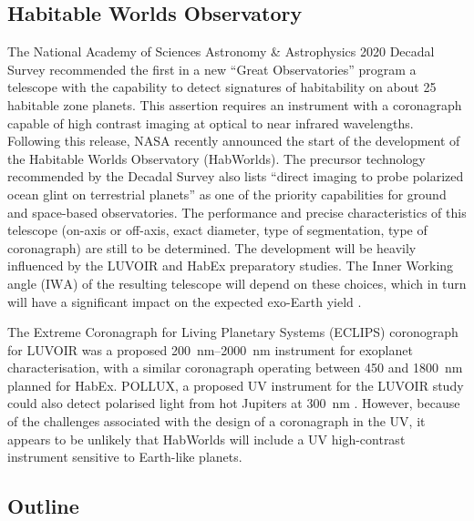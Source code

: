 \documentclass[
    usenatbib,
]{mnras}
\newcommand{\IWA}{\ensuremath{\mathrm{IWA}}}
\newcommand{\hwo}{HabWorlds}
\begin{document}
\subsection{Habitable Worlds Observatory}

The National Academy of Sciences Astronomy \& Astrophysics 2020 Decadal Survey \citep{decadal} recommended the first in a new \enquote{Great Observatories} program a telescope with the capability to detect signatures of habitability on about 25 habitable zone planets.
%
This assertion requires an instrument with a coronagraph capable of high contrast imaging at optical to near infrared wavelengths.
%
Following this release, NASA recently announced the start of the development of the Habitable Worlds Observatory (\hwo).
%
The precursor technology recommended by the Decadal Survey also lists ``direct imaging to probe polarized ocean glint on terrestrial planets'' as one of the priority capabilities \citep[Box E.1 in][]{decadal} for ground and space-based observatories.
%
The performance and precise characteristics of this telescope (on-axis or off-axis, exact diameter, type of segmentation, type of coronagraph) are still to be determined.
%
The development will be heavily influenced by the LUVOIR \citep{LUVOIR2019} and HabEx \citep{HabEx_2020} preparatory studies.
%
The Inner Working angle (\IWA{}) of the resulting telescope will depend on these choices, which in turn will have a significant impact on the expected exo-Earth yield \citep{Stark2019_exoplanetyield}.

The Extreme Coronagraph for Living Planetary Systems (ECLIPS) coronograph for LUVOIR was a proposed \SIrange{200}{2000}{\nano\meter} instrument for exoplanet characterisation, with a similar coronagraph operating between \num{450} and \SI{1800}{\nano\meter} planned for HabEx.
%
POLLUX, a proposed UV instrument for the LUVOIR study could also detect  polarised light from hot Jupiters at \SI{300}{\nano\meter} \citep{Bouret2018_pollux}.
%
However, because of the challenges associated with the design of a coronagraph in the UV, it appears to be unlikely that \hwo{} will include a UV high-contrast instrument sensitive to Earth-like planets.


\subsection{Outline}
\end{document}
